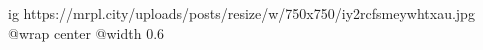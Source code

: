  
 
 
 
 

\ifcmt
  ig https://mrpl.city/uploads/posts/resize/w/750x750/iy2rcfsmeywhtxau.jpg
  @wrap center
  @width 0.6
\fi
